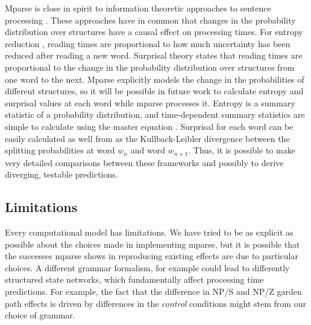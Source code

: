 \documentclass[a4paper, 12pt]{article}
\newcommand{\todo}[1]{\textcolor{red}{\textbf{TODO: #1}}}
\begin{document}
%

Mparse is close in spirit to information theoretic approaches to sentence
processing \citep{hale2016information, hale2003information,
    levy2008expectation}. These approaches have in common that changes in the
probability distribution over structures have a causal effect on processing
times. For entropy reduction \citep{hale2003information}, reading times are
proportional to how much uncertainty has been reduced after reading a new word.
Surprisal theory states that reading times are proportional to the change in
the probability distribution over structures from one word to the next.
Mparse explicitly models the change in the probabilities of different
structures, so it will be possible in future work to calculate entropy and
surprisal values at each word while mparse processes it. Entropy is a summary
statistic of a probability distribution, and time-dependent summary statistics
are simple to calculate using the master equation
\citep[e.g.][]{lu2005kinetics, levy2002eigenvalue}. Surprisal for each word can
be easily calculated as well from as the Kullback-Leibler divergence between the
splitting probabilities at word $w_n$ and word $w_{n+1}$. Thus, it is possible
to make very detailed comparisons between these frameworks and possibly to
derive diverging, testable predictions.

\subsection{Limitations}
Every computational model has limitations. We have tried to be as explicit as
possible about the choices made in implementing mparse, but it is possible that
the successes mparse shows in reproducing existing effects are due to
particular choices. A different grammar formalism, for example could lead to
differently structured state networks, which fundamentally affect processing
time predictions. For example, the fact that the difference in NP/S and NP/Z garden path
effects is driven by differences in the \emph{control} conditions might stem
from our choice of grammar.
\end{document}
